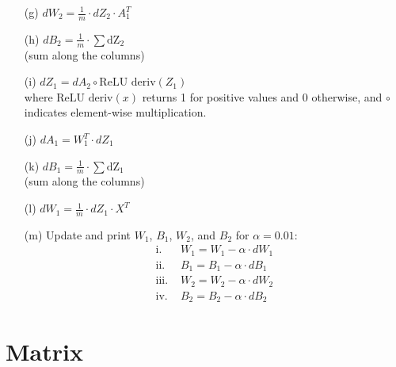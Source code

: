 \begin{enumerate}
\begin{enumerate}
    \item[(g)] \( dW_2 = \frac{1}{m} \cdot dZ_2 \cdot A_1^T \)

    \item[(h)] \( dB_2 = \frac{1}{m} \cdot \sum \text{dZ}_2 \) \\
  (sum along the columns)

    \item[(i)] \( dZ_1 = dA_2 \circ \text{ReLU deriv}(Z_1) \) \\
  where \( \text{ReLU deriv}(x) \) returns 1 for positive values and 0 otherwise, and \( \circ \) indicates element-wise multiplication.

    \item[(j)] \( dA_1 = W_1^T \cdot dZ_1 \)

    \item[(k)] \( dB_1 = \frac{1}{m} \cdot \sum \text{dZ}_1 \) \\
  (sum along the columns)

    \item[(l)] \( dW_1 = \frac{1}{m} \cdot dZ_1 \cdot X^T \)

    \item[(m)] Update and print \( W_1 \), \( B_1 \), \( W_2 \), and \( B_2 \) for \( \alpha = 0.01 \):
    \begin{align*}
    \text{i. } & W_1 = W_1 - \alpha \cdot dW_1 \\
    \text{ii. } & B_1 = B_1 - \alpha \cdot dB_1 \\
    \text{iii. } & W_2 = W_2 - \alpha \cdot dW_2 \\
    \text{iv. } & B_2 = B_2 - \alpha \cdot dB_2
    \end{align*}

    \end{enumerate}
\end{enumerate}









\section{Matrix}
\vspace{-.15cm}
